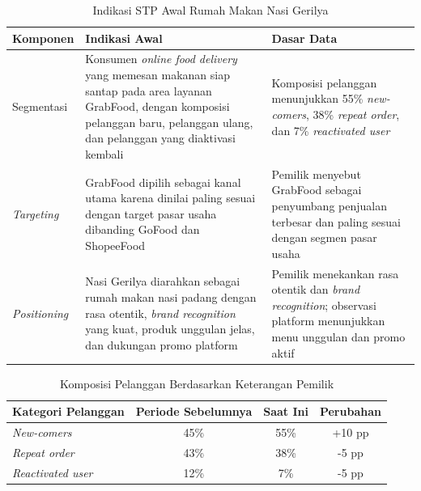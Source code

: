 \begin{table}[h!]
    \centering
    \caption{Indikasi STP Awal Rumah Makan Nasi Gerilya}
    \label{tab:stp_prasurvey2}
    \begin{tabularx}{\textwidth}{p{2.8cm}YY}
        \toprule
        \textbf{Komponen} & \textbf{Indikasi Awal}                                                                                                                                 & \textbf{Dasar Data}                                                                                                          \\
        \midrule
        Segmentasi        & Konsumen \textit{online food delivery} yang memesan makanan siap santap pada area layanan GrabFood, dengan komposisi pelanggan baru, pelanggan ulang, dan pelanggan yang diaktivasi kembali & Komposisi pelanggan menunjukkan 55\% \textit{new-comers}, 38\% \textit{repeat order}, dan 7\% \textit{reactivated user} \\
        \textit{Targeting}   & GrabFood dipilih sebagai kanal utama karena dinilai paling sesuai dengan target pasar usaha dibanding GoFood dan ShopeeFood                                                          & Pemilik menyebut GrabFood sebagai penyumbang penjualan terbesar dan paling sesuai dengan segmen pasar usaha                \\
        \textit{Positioning} & Nasi Gerilya diarahkan sebagai rumah makan nasi padang dengan rasa otentik, \textit{brand recognition} yang kuat, produk unggulan jelas, dan dukungan promo platform                 & Pemilik menekankan rasa otentik dan \textit{brand recognition}; observasi platform menunjukkan menu unggulan dan promo aktif \\
        \bottomrule
    \end{tabularx}
\end{table}

\begin{table}[h!]
    \centering
    \caption{Komposisi Pelanggan Berdasarkan Keterangan Pemilik}
    \label{tab:prasurvey2_pelanggan}
    \begin{tabularx}{\textwidth}{Yccc}
        \toprule
        \textbf{Kategori Pelanggan} & \textbf{Periode Sebelumnya} & \textbf{Saat Ini} & \textbf{Perubahan} \\
        \midrule
        \textit{New-comers}         & 45\%                        & 55\%              & +10 pp             \\
        \textit{Repeat order}       & 43\%                        & 38\%              & -5 pp              \\
        \textit{Reactivated user}   & 12\%                        & 7\%               & -5 pp              \\
        \bottomrule
    \end{tabularx}
\end{table}

